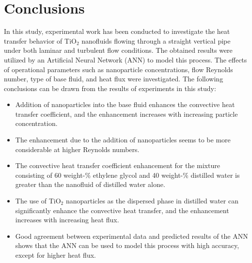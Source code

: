 \documentclass{article}
\begin{document}
\section{Conclusions}

In this study, experimental work has been conducted to investigate the heat transfer behavior of TiO$_2$ nanofluids flowing through a straight vertical pipe under both laminar and turbulent flow conditions. The obtained results were utilized by an Artificial Neural Network (ANN) to model this process. The effects of operational parameters such as nanoparticle concentrations, flow Reynolds number, type of base fluid, and heat flux were investigated. The following conclusions can be drawn from the results of experiments in this study:

\begin{itemize}
	\item Addition of nanoparticles into the base fluid enhances the convective heat transfer coefficient, and the enhancement increases with increasing particle concentration.
	\item The enhancement due to the addition of nanoparticles seems to be more considerable at higher Reynolds numbers.
	\item The convective heat transfer coefficient enhancement for the mixture consisting of 60 weight-\% ethylene glycol and 40 weight-\% distilled water is greater than the nanofluid of distilled water alone.
	\item The use of TiO$_2$ nanoparticles as the dispersed phase in distilled water can significantly enhance the convective heat transfer, and the enhancement increases with increasing heat flux.
	\item Good agreement between experimental data and predicted results of the ANN shows that the ANN can be used to model this process with high accuracy, except for higher heat flux.
\end{itemize}



\appendix
\end{document}

